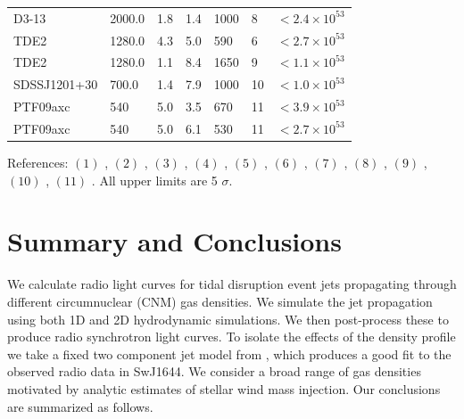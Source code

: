 \documentclass[usenatbib,fleqn]{mnras}
\begin{document}
\begin{table}
\begin{threeparttable}
\begin{tabular*}{1.5\columnwidth}{lllllll}
D3-13 & 2000.0 & 1.8 & 1.4 & 1000 & 8 & $< 2.4 \times 10^{ 53 }$ \\
TDE2 & 1280.0 & 4.3 & 5.0 & 590 & 6 & $< 2.7 \times 10^{ 53 }$ \\
TDE2 & 1280.0 & 1.1 & 8.4 & 1650 & 9 & $< 1.1 \times 10^{ 53 }$ \\
SDSSJ1201+30 & 700.0 & 1.4 & 7.9 & 1000 & 10 & $< 1.0 \times 10^{ 53 }$ \\
PTF09axc & 540 & 5.0 & 3.5 & 670 & 11 & $< 3.9 \times 10^{ 53 }$ \\
PTF09axc & 540 & 5.0 & 6.1 & 530 & 11 & $< 2.7 \times 10^{ 53 }$ \\
\end{tabular*}
\begin{tablenotes}
\item References: $(1)$ \citet{Alexander+2015, van-Velzen+2015}, $(2)$
  \citet{Drake+2011}, $(3)$ \citet{Berger+2012, Zauderer+2013} , $(4)$ \citet{Cenko+2012},
  $(5)$ \citet{Bower+2013}, $(6)$ \citet{van-Velzen+2013}, $(7)$
  \citet{Bade+1996, Komossa2002}, $(8)$
  \citet{Gezari+2008,Bower+2011}, $(9)$ \citet{van-Velzen+2011},
  $(10)$ \citet{Saxton+2012}, $(11)$ \citet{Arcavi+2014}. All upper
  limits are 5 $\sigma$.
\end{tablenotes}
\end{threeparttable}
\end{table}

\section{Summary and Conclusions}
\label{sec:conc}

We calculate radio light curves for tidal disruption event jets
propagating through different circumnuclear (CNM) gas densities. We
simulate the jet propagation using both 1D and 2D hydrodynamic
simulations. We then post-process these to produce radio synchrotron
light curves. To isolate the effects of the density profile we take a
fixed two component jet model from \citet{Mimica+2015}, which produces
a good fit to the observed radio data in SwJ1644. We
consider a broad range of gas densities motivated by analytic
estimates of stellar wind mass injection. Our conclusions
are summarized as follows.
\end{document}
